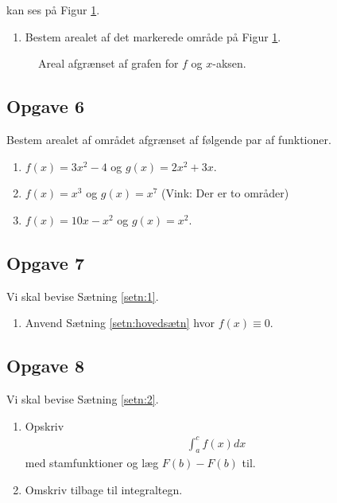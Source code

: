 kan ses på Figur \ref{fig:opg5}.
\begin{enumerate}[label=\roman*)]
	\item Bestem arealet af det markerede område på Figur \ref{fig:opg5}.
\end{enumerate}
\begin{figure}[H]
	\centering
	\caption{Areal afgrænset af grafen for $f$ og $x$-aksen.}
	\label{fig:opg5}
\end{figure}

\newpage

\subsection*{Opgave 6}
Bestem arealet af området afgrænset af følgende par af funktioner.
\begin{enumerate}[label=\roman*)]
	\item $f(x) = 3x^2-4$ og $g(x) = 2x^2 + 3x$.
	\item $f(x) = x^3$ og $g(x) = x^7$ (Vink: Der er to områder)
	\item $f(x) = 10x - x^2$ og $g(x) = x^2$.
\end{enumerate}

\subsection*{Opgave 7}
Vi skal bevise Sætning \ref{setn:1}.
\begin{enumerate}[label=\roman*)]
	\item Anvend Sætning \ref{setn:hovedsætn} hvor $f(x) \equiv 0$.
\end{enumerate}

\subsection*{Opgave 8}
Vi skal bevise Sætning \ref{setn:2}.
\begin{enumerate}[label=\roman*)]
	\item Opskriv
	\begin{align*}
		\int_a^c f(x) dx
	\end{align*} 
	med stamfunktioner og læg $F(b)-F(b)$ til.
	\item Omskriv tilbage til integraltegn.
\end{enumerate}